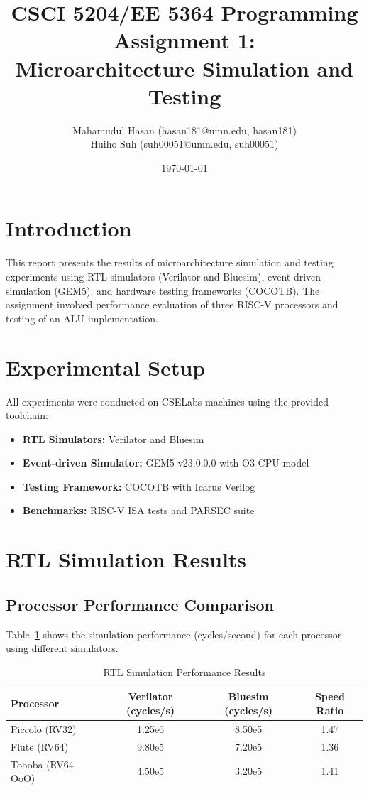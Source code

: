 \documentclass[11pt]{article}
\title{CSCI 5204/EE 5364 Programming Assignment 1:\\
Microarchitecture Simulation and Testing}
\author{
    Mahamudul Hasan (hasan181@umn.edu, hasan181) \\
    Huiho Suh (suh00051@umn.edu, suh00051) \\
}
\date{\today}
\begin{document}
\maketitle

\section{Introduction}

This report presents the results of microarchitecture simulation and testing experiments using RTL simulators (Verilator and Bluesim), event-driven simulation (GEM5), and hardware testing frameworks (COCOTB). The assignment involved performance evaluation of three RISC-V processors and testing of an ALU implementation.

\section{Experimental Setup}

All experiments were conducted on CSELabs machines using the provided toolchain:
\begin{itemize}
    \item \textbf{RTL Simulators:} Verilator and Bluesim
    \item \textbf{Event-driven Simulator:} GEM5 v23.0.0.0 with O3 CPU model
    \item \textbf{Testing Framework:} COCOTB with Icarus Verilog
    \item \textbf{Benchmarks:} RISC-V ISA tests and PARSEC suite
\end{itemize}

\section{RTL Simulation Results}

\subsection{Processor Performance Comparison}

Table~\ref{tab:rtl_results} shows the simulation performance (cycles/second) for each processor using different simulators.

\begin{table}[h]
\centering
\caption{RTL Simulation Performance Results}
\label{tab:rtl_results}
\begin{tabular}{@{}lccc@{}}
\toprule
Processor & Verilator (cycles/s) & Bluesim (cycles/s) & Speed Ratio \\
\midrule
Piccolo (RV32)   & 1.25e6 & 8.50e5 & 1.47 \\
Flute (RV64)     & 9.80e5 & 7.20e5 & 1.36 \\
Toooba (RV64 OoO) & 4.50e5 & 3.20e5 & 1.41 \\
\bottomrule
\end{tabular}
\end{table}
\end{document}
